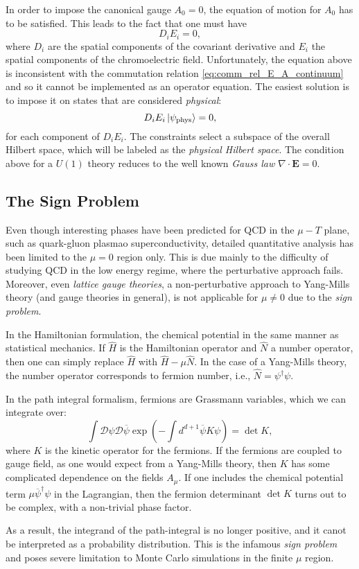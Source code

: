 In order to impose the canonical gauge $A_0 = 0$, the equation of motion for $A_0$ has to be satisfied.
This leads \citneeded to the fact that one must have
\begin{equation}
    D_i E_i = 0,
\end{equation}
where $D_i$ are the spatial components of the covariant derivative and $E_i$ the spatial components of the chromoelectric field.
Unfortunately, the equation above is inconsistent with the commutation relation \eqref{eq:comm_rel_E_A_continuum} and so it cannot be implemented as an operator equation.
The easiest solution is to impose it on states that are considered \emph{physical}:
\begin{equation}
    D_i E_i \ket{\psi_{\text{phys}}} = 0,
\end{equation}
for each component of $D_i E_i$.
The constraints select a subspace of the overall Hilbert space, which will be labeled as the \emph{physical Hilbert space}.
The condition above for a $U(1)$ theory reduces to the well known \emph{Gauss law} $\nabla \cdot \mathbf{E} = 0$.


\subsection{The Sign Problem}
\label{sub:the_sign_problem}

Even though interesting phases have been predicted for QCD in the $\mu - T$ plane\citneeded, such as quark-gluon plasma\citneeded o superconductivity\citneeded, detailed quantitative analysis has been limited to the $\mu = 0$ region only.
This is due mainly to the difficulty of studying QCD in the low energy regime, where the perturbative approach fails\citneeded.
Moreover, even \emph{lattice gauge theories}, a non-perturbative approach to Yang-Mills theory (and gauge theories in general), is not applicable for $\mu \neq 0$ due to the \emph{sign problem}.

In the Hamiltonian formulation, the chemical potential in the same manner as statistical mechanics.
If $\hat{H}$ is the Hamiltonian operator and $\hat{N}$ a number operator, then one can simply replace $\hat{H}$ with $\hat{H} - \mu \hat{N}$.
In the case of a Yang-Mills theory, the number operator corresponds to fermion number, i.e., $\hat{N} = \psi^{\dagger} \psi$.

In the path integral formalism, fermions are Grassmann variables, which we can integrate over:
\begin{equation}
    \int \mathcal{D} \psi \mathcal{D} \overline{\psi} \exp(-\int d^{d+1} \overline{\psi} K \psi) = \det K,
\end{equation}
where $K$ is the kinetic operator for the fermions.
If the fermions are coupled to gauge field, as one would expect from a Yang-Mills theory, then $K$ has some complicated dependence on the fields $A_{\mu}$.
If one includes the chemical potential term $\mu \overline{\psi}^{\dagger} \psi$ in the Lagrangian, then the fermion determinant $\det K$ turns out to be complex\citneeded, with a non-trivial phase factor.

As a result, the integrand of the path-integral is no longer positive, and it canot be interpreted as a probability distribution.
This is the infamous \emph{sign problem} and poses severe limitation to Monte Carlo simulations in the finite $\mu$ region.
